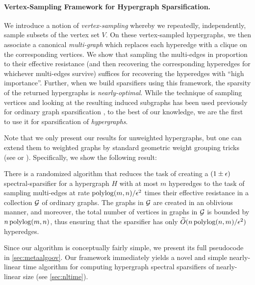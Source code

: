 \documentclass{article}
\begin{document}
\paragraph{Vertex-Sampling Framework for Hypergraph Sparsification.} We introduce a notion of \emph{vertex-sampling} whereby we repeatedly, independently, sample subsets of the vertex set $V$. On these vertex-sampled hypergraphs, we then associate a canonical \emph{multi-graph} which replaces each hyperedge with a clique on the corresponding vertices. We show that sampling the multi-edges in proportion to their effective resistance (and then recovering the corresponding hyperedges for whichever multi-edges survive) suffices for recovering the hyperedges with ``high importance''. Further, when we build sparsifiers using this framework, the sparsity of the returned hypergraphs is \emph{nearly-optimal}. 
While the technique of sampling vertices and looking at the resulting induced subgraphs
has been used previously for ordinary graph sparsification \cite{FiltserKN21,ChenKL22},
to the best of our knowledge,
we are the first to use it for sparsification of \textit{hypergraphs}.

Note that we only present our results for unweighted hypergraphs,
but one can extend them to weighted graphs by standard geometric weight grouping tricks (see \cite{KLMMS14} or \cite{ADKKP16}).
Specifically, we show the following result:

\begin{theorem}[Informal]\label{thm:vertexSamplingMainintro}
    There is a randomized algorithm that reduces the task of creating a $(1 \pm \epsilon)$ spectral-sparsifier for a hypergraph $H$ with at most $m$ hyperedges to the task of sampling multi-edges at rate $\operatorname{polylog}(m,n) / \epsilon^2$ times their effective resistance in a collection $\mathcal{G}$ of ordinary graphs.
    The graphs in $\mathcal{G}$ are created in an oblivious manner, and moreover, the total number of vertices in graphs in $\mathcal{G}$ is bounded by $n \operatorname{polylog}(m,n)$, thus ensuring that the sparsifier has only $\widetilde{O}(n \operatorname{polylog}(n,m) / \epsilon^2)$ hyperedges.
\end{theorem}

Since our algorithm is conceptually fairly simple, we present its full pseudocode
in \cref{sec:metaalgoov}.
Our framework immediately yields a novel and simple
nearly-linear time algorithm for computing
hypergraph spectral sparsifiers of nearly-linear size (see \cref{sec:nltime}).
\end{document}
